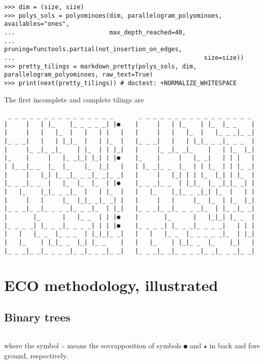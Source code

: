 \begin{verbatim}
>>> dim = (size, size)
>>> polys_sols = polyominoes(dim, parallelogram_polyominoes, availables="ones",
...                          max_depth_reached=40,
...                          pruning=functools.partial(not_insertion_on_edges,
...                                                    size=size))
>>> pretty_tilings = markdown_pretty(polys_sols, dim, parallelogram_polyominoes, raw_text=True)
>>> print(next(pretty_tilings)) # doctest: +NORMALIZE_WHITESPACE
\end{verbatim}
The first incomplete and complete tilings are
\begin{Verbatim}
 _ _ _ _ _ _ _ _ _ _ _ _ _ _ _       _ _ _ _ _ _ _ _ _ _ _ _ _ _ _ _
|     |   | |_    |_ _ _ _ _| |●    |     |   | |_    | |_  |_ _    |
|     |   |   |_  |   |   | |   |   |     |   |   |_  |   |_ _ _|_ _|
|_ _ _|   |   | |_|_  |   | |_  |   |_ _ _|   |   | |_|_ _ _|_ _ _  |
|     |_ _|_ _|_    | |_  | | |_|   |     |_ _|_ _|_    |   | |_  |_|
|_    |     |   |_ _|_| |_| | |●    |_    |     |   |_ _|   | | |   |
| |_ _|_ _  |_  |_    |_  |_|   |   | |_ _|_ _  |_  | | |_  | | |_ _|
|     |   |_| |_ _|_ _ _|_ _|_ _|   |     |   |_| | | |_  |_| | |_  |
|_ _ _|_ _  |   |_  |_  |_  | |●    |_ _ _|_ _  | |_|_  |_ _|_|_ _| |
|   |_    |_|_ _ _|_  |   | |_  |   |   |_    |_|_ _ _|_| |_  |   | |
|     |   |     |_  |_|_ _|_ _| |   |     |   |     |_  |_  | |_  |_|
|_ _ _|_ _|_ _ _ _|_ _ _|_  | |_|   |_ _ _|_ _|_ _ _ _|_  | |_ _|_ _|
|       |_      |   |_ _  | | |●    |       |_      |   |_|_| |_ _  |
|_ _ _ _| |_ _ _|_ _ _ _| | | |●    |_ _ _ _| |_ _ _|_ _ _ _|   | | |
|   |   |_ _  |_ _ _  | |_|_|_ _|   |   |   |_ _  |_ _ _ _ _|_  | |_|
|   |_    | |_|_ _  |_| |_ _    |   |   |_    | |_|_ _  |_    |_|   |
|_ _ _|_ _|_ _ _ _|_ _|_ _ _|_ _|   |_ _ _|_ _|_ _ _ _|_ _|_ _ _|_ _|
\end{Verbatim}

\section{ECO methodology, illustrated}

\subsection{Binary trees}

\inputminted[fontsize=\small,stripnl=false,firstline=163,lastline=172]{python}{backtracking/ECO.py}

\begin{margintable}%
where the symbol \verb|☆| means the sovrapposition of symbols \verb|●| and
\verb|★| in back and fore ground, respectively.  
\end{margintable}
